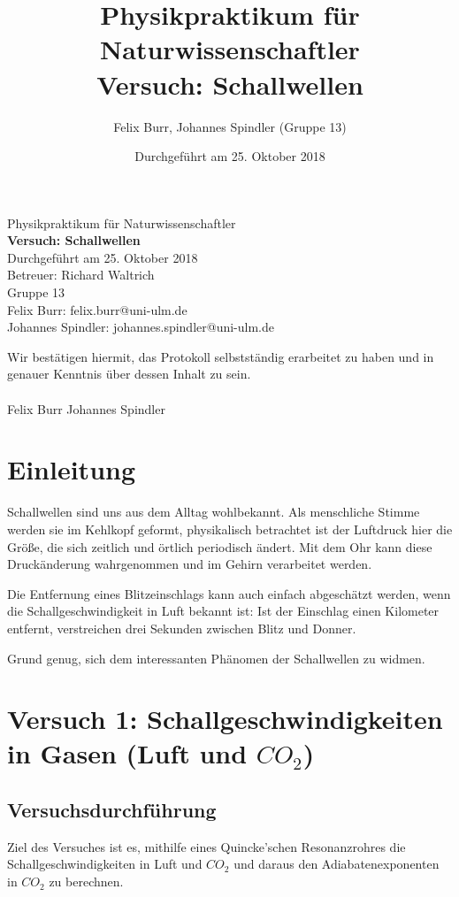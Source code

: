 \documentclass{scrartcl}
\title{Physikpraktikum für Naturwissenschaftler \\ Versuch: Schallwellen}
\author{Felix Burr, Johannes Spindler (Gruppe 13)}
\date{Durchgeführt am 25. Oktober 2018}
\begin{document}
\begin{titlepage}
  \begin{center}
    \vspace*{1cm}
    \LARGE
    Physikpraktikum für Naturwissenschaftler \\
    \vspace*{1cm}
    \Huge
    \textbf{Versuch: Schallwellen} \\
    \vspace*{0.3cm}
    \Large
    Durchgeführt am 25. Oktober 2018 \\
    Betreuer: Richard Waltrich \\
    \vspace*{2.5cm}
    Gruppe 13 \\
    Felix Burr: felix.burr@uni-ulm.de \\
    Johannes Spindler: johannes.spindler@uni-ulm.de \\
    \vfill 
  \end{center}
  Wir bestätigen hiermit, das Protokoll selbstständig erarbeitet zu haben und in genauer Kenntnis über dessen Inhalt zu sein. \\
  \vspace*{0.8cm}
  \\
  Felix Burr
  \hfill
  Johannes Spindler
\end{titlepage}
\pagebreak
\tableofcontents


\pagebreak

\section{Einleitung}
Schallwellen sind uns aus dem Alltag wohlbekannt. Als menschliche Stimme werden sie im Kehlkopf geformt, physikalisch betrachtet ist der Luftdruck hier die Größe, die sich zeitlich und örtlich periodisch ändert. Mit dem Ohr kann diese Druckänderung wahrgenommen und im Gehirn verarbeitet werden.

Die Entfernung eines Blitzeinschlags kann auch einfach abgeschätzt werden, wenn die Schallgeschwindigkeit in Luft bekannt ist: Ist der Einschlag einen Kilometer entfernt, verstreichen drei Sekunden zwischen Blitz und Donner.

Grund genug, sich dem interessanten Phänomen der Schallwellen zu widmen.
\section{Versuch 1: Schallgeschwindigkeiten in Gasen (Luft und $CO_{2}$)}
\subsection{Versuchsdurchführung}
Ziel des Versuches ist es, mithilfe eines Quincke'schen Resonanzrohres die Schallgeschwindigkeiten in Luft und $CO_{2}$ und daraus den Adiabatenexponenten in $CO_{2}$ zu berechnen.
\\
\end{document}
